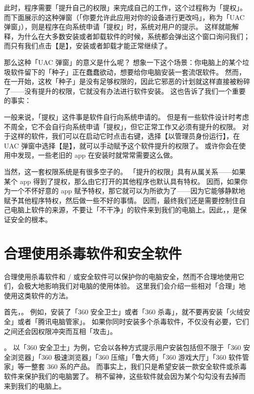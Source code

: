 此时，程序需要「提升自己的权限」来完成自己的工作，这个过程称为「提权」。
而下面展示的这种弹窗（「你要允许此应用对你的设备进行更改吗」，称为「UAC 弹窗」），则是程序在向系统申请「提权」时，系统对用户的提示。
这样就能解释，为什么在大多数安装或者卸载软件的时候，系统都会弹出这个窗口询问我们；而只有我们点击【是】，安装或者卸载才能正常继续了。

那么这种「UAC 弹窗」的意义是什么呢？
想象一下这个场景：你电脑上的某个垃圾软件留下的「种子」正在蠢蠢欲动，想要给你电脑安装一套流氓软件。
然而，在一开始，这枚「种子」是没有足够权限的，因此它邪恶的计划就这样直接被粉碎了——没有提升的权限，它就没有办法进行软件安装。
这也告诉了我们一个重要的事实：

一般来说，「提权」这件事是软件自行向系统申请的。
但是有一些软件设计时考虑不周全，它不会自行向系统申请「提权」，但它正常工作又必须有提升的权限。
对于这样的软件，我们可以在启动它时点击右键，选择【以管理员身份运行】，在 UAC 弹窗中选择【是】，就可以手动赋予这个软件提升的权限了。
或许你会在使用中发现，一些老旧的 app 在安装时就常常需要这么做。

当然，这一套权限系统是有很多空子的。
「提升的权限」具有从属关系——如果某个 app 得到了提权，那么由它打开的其他程序也默认具有特权。
因而，如果你为一个不怀好意的 app 赋予特权，那它就可以为所欲为了——因为它能够静默地赋予其他程序特权，然后做一些不好的事情。
因而，最终我们还是需要控制住自己电脑上软件的来源，不要让「不干净」的软件来到我们的电脑上。因此，，是保证安全的根本。

\section{合理使用杀毒软件和安全软件}

合理使用杀毒软件和 / 或安全软件可以保护你的电脑安全，然而不合理地使用它们，会极大地影响我们对电脑的使用体验。
这里我们会介绍一些相对「合理」地使用这类软件的方法。

首先，。
例如，安装了「360 安全卫士」或者「360 杀毒」，就不要再安装「火绒安全」或者「腾讯电脑管家」。
如果你同时安装多个杀毒软件，不仅没有必要，它们之间还会因权限冲突而互相「攻击」。

。
以「360 安全卫士」为例，它会以各种方式提示用户安装包括但不限于「360 安全浏览器」「360 极速浏览器」「360 压缩」「鲁大师」「360 游戏大厅」「360 软件管家」等一整套 360 系的产品。
而事实上，我们只是希望安装一款安全软件或杀毒软件来保护我们的电脑罢了。
稍不留神，这些软件就会因为某个勾勾没有去掉而来到我们的电脑上。

